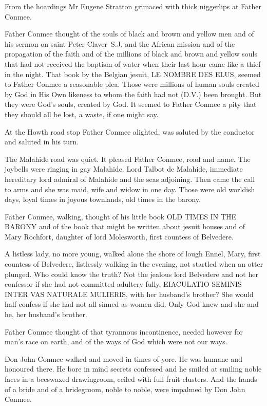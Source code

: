 From the hoardings Mr Eugene Stratton grimaced with thick niggerlips at
Father Conmee.

Father Conmee thought of the souls of black and brown and yellow
men and of his sermon on saint Peter Claver~S.J. and the African mission
and of the propagation of the faith and of the millions of black and brown
and yellow souls that had not received the baptism of water when their last
hour came like a thief in the night. That book by the Belgian jesuit, LE
NOMBRE DES ELUS, seemed to Father Conmee a reasonable plea. Those were
millions of human souls created by God in His Own likeness to whom the
faith had not (D.V.) been brought. But they were God's souls, created by
God. It seemed to Father Conmee a pity that they should all be lost, a
waste, if one might say.

At the Howth road stop Father Conmee alighted, was saluted by the
conductor and saluted in his turn.

The Malahide road was quiet. It pleased Father Conmee, road and
name. The joybells were ringing in gay Malahide. Lord Talbot de Malahide,
immediate hereditary lord admiral of Malahide and the seas adjoining.
Then came the call to arms and she was maid, wife and widow in one day.
Those were old worldish days, loyal times in joyous townlands, old times
in the barony.

Father Conmee, walking, thought of his little book OLD TIMES IN THE
BARONY and of the book that might be written about jesuit houses and of
Mary Rochfort, daughter of lord Molesworth, first countess of Belvedere.

A listless lady, no more young, walked alone the shore of lough
Ennel, Mary, first countess of Belvedere, listlessly walking in the
evening, not startled when an otter plunged. Who could know the truth?
Not the jealous lord Belvedere and not her confessor if she had not
committed adultery fully, EIACULATIO SEMINIS INTER VAS NATURALE MULIERIS,
with her husband's brother? She would half confess if she had not all
sinned as women did. Only God knew and she and he, her husband's brother.

Father Conmee thought of that tyrannous incontinence, needed
however for man's race on earth, and of the ways of God which were not
our ways.

Don John Conmee walked and moved in times of yore. He was
humane and honoured there. He bore in mind secrets confessed and he
smiled at smiling noble faces in a beeswaxed drawingroom, ceiled with full
fruit clusters. And the hands of a bride and of a bridegroom, noble to
noble, were impalmed by Don John Conmee.

